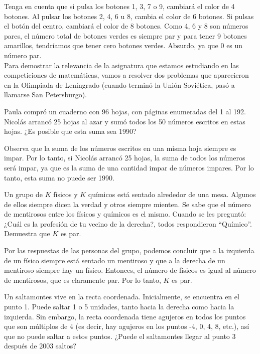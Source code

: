 \documentclass[11pt]{scrartcl}
\begin{document}
Tenga en cuenta que si pulsa los botones 1, 3, 7 o 9, cambiará el color de 4 botones. Al pulsar los botones 2, 4, 6 u 8, cambia el color de 6 botones. Si pulsas el botón del centro, cambiará el color de 8 botones. Como 4, 6 y 8 son números pares, el número total de botones verdes es siempre par y para tener 9 botones amarillos, tendríamos que tener cero botones verdes. Absurdo, ya que 0 es un número par.\\

Para demostrar la relevancia de la asignatura que estamos estudiando en las competiciones de matemáticas, vamos a resolver dos problemas que aparecieron en la Olimpiada de Leningrado (cuando terminó la Unión Soviética, pasó a llamarse San Petersburgo).

\begin{example}[Leningrado 1990]
Paula compró un cuaderno con 96 hojas, con páginas enumeradas del 1 al 192. Nicolás arrancó 25 hojas al azar y sumó todos los 50 números escritos en estas hojas. ¿Es posible que esta suma sea 1990?
\end{example}

Observa que la suma de los números escritos en una misma hoja siempre es impar. Por lo tanto, si Nicolás arrancó 25 hojas, la suma de todos los números será impar, ya que es la suma de una cantidad impar de números impares. Por lo tanto, esta suma no puede ser 1990.

\begin{example}[Leningrado 1989]
Un grupo de \( K \) físicos y \( K \) químicos está sentado alrededor de una mesa. Algunos de ellos siempre dicen la verdad y otros siempre mienten. Se sabe que el número de mentirosos entre los físicos y químicos es el mismo. Cuando se les preguntó: ¿Cuál es la profesión de tu vecino de la derecha?, todos respondieron ``Químico''. Demuestra que \( K \) es par.
\end{example}

Por las respuestas de las personas del grupo, podemos concluir que a la izquierda de un físico siempre está sentado un mentiroso y que a la derecha de un mentiroso siempre hay un físico. Entonces, el número de físicos es igual al número de mentirosos, que es claramente par. Por lo tanto, \( K \) es par.

\begin{example}
Un saltamontes vive en la recta coordenada. Inicialmente, se encuentra en el punto 1. Puede saltar 1 o 5 unidades, tanto hacia la derecha como hacia la izquierda. Sin embargo, la recta coordenada tiene agujeros en todos los puntos que son múltiplos de 4 (es decir, hay agujeros en los puntos -4, 0, 4, 8, etc.), así que no puede saltar a estos puntos. ¿Puede el saltamontes llegar al punto 3 después de 2003 saltos?
\end{example}
\end{document}

